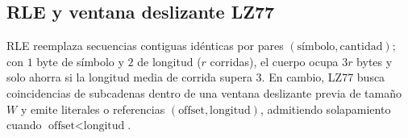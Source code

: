 \subsection{RLE y ventana deslizante LZ77}
RLE reemplaza secuencias contiguas idénticas por pares $(\text{símbolo},\text{cantidad})$; con $1$ byte de símbolo y $2$ de longitud ($r$ corridas), el cuerpo ocupa $3r$ bytes y solo ahorra si la longitud media de corrida supera $3$. En cambio, LZ77 busca coincidencias de subcadenas dentro de una ventana deslizante previa de tamaño $W$ y emite literales o referencias $(\text{offset},\text{longitud})$, admitiendo solapamiento cuando $\text{offset}<\text{longitud}$.
